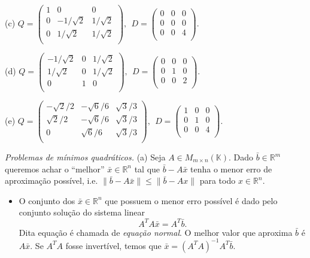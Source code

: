 \documentclass[10pt]{article}
\theoremstyle{plain}
\theoremstyle{obs}
\numberwithin{equation}{section}
\begin{document}
\begin{enumerate}
(c)
$
Q=
\begin{pmatrix}
1 & 0 & 0 \\
0 & -1/\sqrt{2} & 1/\sqrt{2} \\
0 & 1/\sqrt{2} & 1/\sqrt{2} \\
\end{pmatrix}, \ \
D=
\begin{pmatrix}
0 & 0 & 0 \\%
0 & 0 & 0 \\
0 & 0 & 4 \\
\end{pmatrix}.
$


(d)
$
Q=
\begin{pmatrix}
-1/\sqrt{2} & 0 & 1/\sqrt{2} \\
 1/\sqrt{2} & 0 & 1/\sqrt{2} \\
 0 & 1 & 0 \\
\end{pmatrix}, \ \
D=
\begin{pmatrix}
0 & 0 & 0 \\%
0 & 1 & 0 \\
0 & 0 & 2 \\
\end{pmatrix}.
$

(e)
$
Q=
\begin{pmatrix}
-\sqrt{2}/2 & -\sqrt{6}/6 & \sqrt{3}/3 \\
\sqrt{2}/2 & -\sqrt{6}/6 & \sqrt{3}/3 \\
0 & \sqrt{6}/6 & \sqrt{3}/3 \\
\end{pmatrix}, \ \
D=
\begin{pmatrix}
1 & 0 & 0 \\%
0 & 1 & 0 \\
0 & 0 & 4 \\
\end{pmatrix}.
$
\end{enumerate}
 


{\it Problemas de mínimos quadráticos.} 
(a) Seja $A \in M_{m\times n}(\mathbb{K})$. Dado $\bar{b} \in \mathbb{R}^{m}$
queremos achar o ``melhor'' $\bar{x} \in \mathbb{R}^{n}$
tal que $\bar{b}-A\bar{x}$ tenha o menor erro de aproximação possível, i.e. 
$\|\bar{b}-A\bar{x}\|\leq \|\bar{b}-Ax\|$ para todo $x \in \mathbb{R}^{n}$.
 \begin{itemize}
  \item O conjunto dos $\bar{x}\in \mathbb{R}^{n}$
 que possuem o menor erro possível é dado pelo conjunto solução do sistema linear 
 $$ A^{T}A \bar{x}=A^{T}\bar{b}.$$
 Dita equação é chamada de {\it equação normal}. 
 O melhor valor que aproxima $\bar{b}$ é $A\bar{x}$. Se $A^{T}A$ fosse invertível,
 temos que $\bar{x}=(A^{T}A)^{-1}A^{T}\bar{b}$.
 \end{itemize}
 
\end{document}
